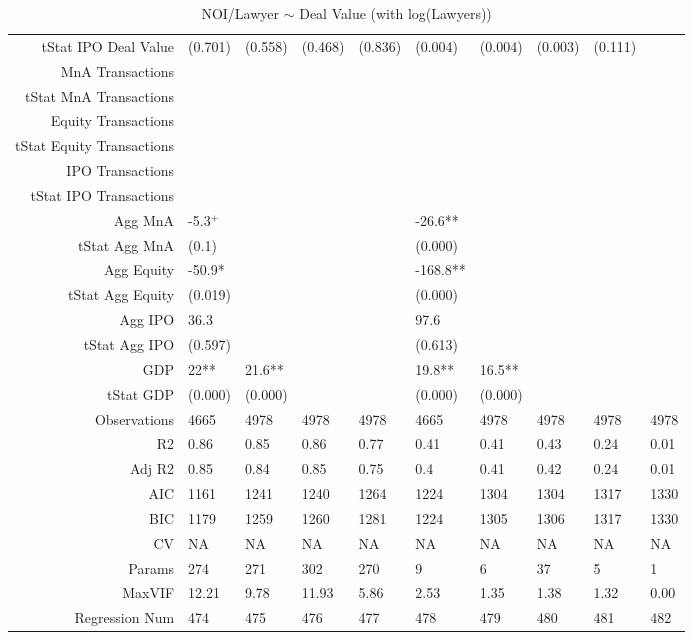 \begin{table}[ht]
\begin{tabular}{rlllllllll}
  tStat IPO Deal Value & (0.701) & (0.558) & (0.468) & (0.836) & (0.004) & (0.004) & (0.003) & (0.111) &  \\ 
  MnA Transactions &  &  &  &  &  &  &  &  &  \\ 
  tStat MnA Transactions &  &  &  &  &  &  &  &  &  \\ 
  Equity Transactions &  &  &  &  &  &  &  &  &  \\ 
  tStat Equity Transactions &  &  &  &  &  &  &  &  &  \\ 
  IPO Transactions &  &  &  &  &  &  &  &  &  \\ 
  tStat IPO Transactions &  &  &  &  &  &  &  &  &  \\ 
  Agg MnA & -5.3$^{+}$ &  &  &  & -26.6** &  &  &  &  \\ 
  tStat Agg MnA & (0.1) &  &  &  & (0.000) &  &  &  &  \\ 
  Agg Equity & -50.9* &  &  &  & -168.8** &  &  &  &  \\ 
  tStat Agg Equity & (0.019) &  &  &  & (0.000) &  &  &  &  \\ 
  Agg IPO & 36.3 &  &  &  & 97.6 &  &  &  &  \\ 
  tStat Agg IPO & (0.597) &  &  &  & (0.613) &  &  &  &  \\ 
  GDP & 22** & 21.6** &  &  & 19.8** & 16.5** &  &  &  \\ 
  tStat GDP & (0.000) & (0.000) &  &  & (0.000) & (0.000) &  &  &  \\ 
  Observations & 4665 & 4978 & 4978 & 4978 & 4665 & 4978 & 4978 & 4978 & 4978 \\ 
  R2 & 0.86 & 0.85 & 0.86 & 0.77 & 0.41 & 0.41 & 0.43 & 0.24 & 0.01 \\ 
  Adj R2 & 0.85 & 0.84 & 0.85 & 0.75 & 0.4 & 0.41 & 0.42 & 0.24 & 0.01 \\ 
  AIC & 1161 & 1241 & 1240 & 1264 & 1224 & 1304 & 1304 & 1317 & 1330 \\ 
  BIC & 1179 & 1259 & 1260 & 1281 & 1224 & 1305 & 1306 & 1317 & 1330 \\ 
  CV & NA & NA & NA & NA & NA & NA & NA & NA & NA \\ 
  Params & 274 & 271 & 302 & 270 & 9 & 6 & 37 & 5 & 1 \\ 
  MaxVIF & 12.21 & 9.78 & 11.93 & 5.86 & 2.53 & 1.35 & 1.38 & 1.32 & 0.00 \\ 
  Regression Num & 474 & 475 & 476 & 477 & 478 & 479 & 480 & 481 & 482 \\ 
   \hline
\end{tabular}
\caption{NOI/Lawyer $\sim$ Deal Value (with log(Lawyers))} 
\end{table}
